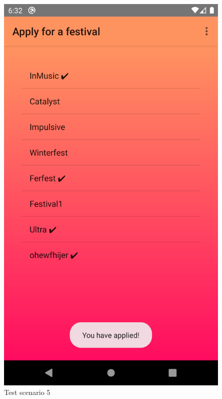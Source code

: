 			\begin{figure}[H]
				\includegraphics[width=\linewidth]{images/test_Screens/test_scenario_5-4.png}
				\caption{Test scenario 5}
				\label{fig:espresso_5_4}
			\end{figure}
			
